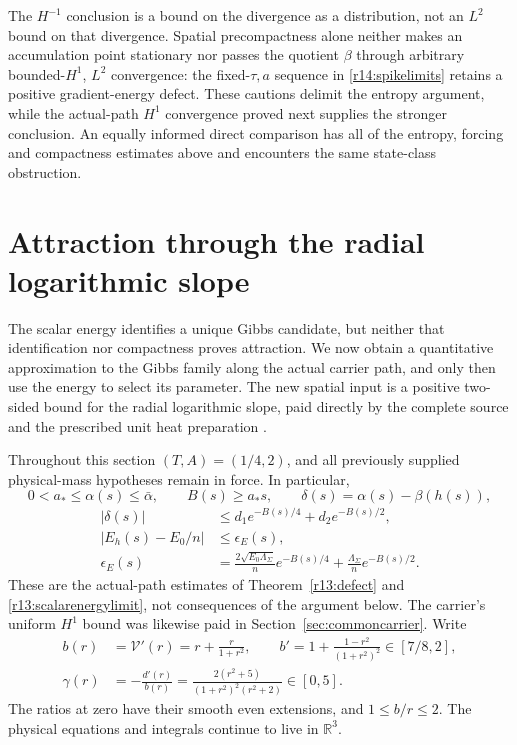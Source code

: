 \documentclass[11pt]{article}
\numberwithin{equation}{section}
\newcommand{\R}{\mathbb R}
\begin{document}
The $H^{-1}$ conclusion is a bound on the divergence as a distribution,
not an $L^2$ bound on that divergence. Spatial precompactness alone
neither makes an accumulation point stationary nor passes the
quotient $\beta$ through arbitrary bounded-$H^1$, $L^2$ convergence:
the fixed-$\tau,a$ sequence in \eqref{r14:spikelimits} retains a
positive gradient-energy defect. These cautions delimit the entropy
argument, while the actual-path $H^1$ convergence proved next supplies
the stronger conclusion. An equally informed direct comparison has all
of the entropy, forcing and compactness estimates above and encounters
the same state-class obstruction.

\section{Attraction through the radial logarithmic slope}
\label{sec:carrierattraction}

The scalar energy identifies a unique Gibbs candidate, but neither that
identification nor compactness proves attraction. We now obtain a
quantitative approximation to the Gibbs family along the actual carrier
path, and only then use the energy to select its parameter. The new
spatial input is a positive two-sided bound for the radial logarithmic
slope, paid directly by the complete source and the prescribed unit heat
preparation \cite{RadialAttractionNote}.

Throughout this section $(T,A)=(1/4,2)$, and all previously supplied
physical-mass hypotheses remain in force. In particular,
\[
 0<a_*\le\alpha(s)\le\bar\alpha,\qquad B(s)\ge a_*s,\qquad
 \delta(s)=\alpha(s)-\beta(h(s)),
\]
\begin{align*}
 |\delta(s)|&\le d_1e^{-B(s)/4}+d_2e^{-B(s)/2},\\
 \big|E_h(s)-E_0/n\big|&\le\epsilon_E(s),\\
 \epsilon_E(s)&=\frac{2\sqrt{E_0\Lambda_\Sigma}}n e^{-B(s)/4}
              +\frac{\Lambda_\Sigma}n e^{-B(s)/2}.
\end{align*}
These are the actual-path estimates of
Theorem~\ref{r13:defect} and \eqref{r13:scalarenergylimit},
not consequences of the argument below.
The carrier's uniform $H^1$ bound was likewise paid in
Section~\ref{sec:commoncarrier}. Write
\begin{equation}\label{r15:radialcoefficients}
 \begin{split}
 b(r)&=\mathcal V'(r)=r+\frac r{1+r^2},\qquad
 b'=1+\frac{1-r^2}{(1+r^2)^2}\in[7/8,2],\\
 \gamma(r)&=-\frac{d'(r)}{b(r)}
 =\frac{2(r^2+5)}{(1+r^2)^2(r^2+2)}\in[0,5].
 \end{split}
\end{equation}
The ratios at zero have their smooth even extensions, and $1\le b/r\le2$.
The physical equations and integrals continue to live in $\R^3$.
\end{document}
